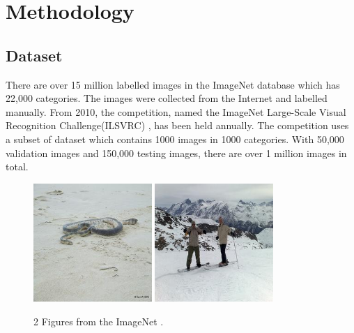 
\chapter{Methodology} %
\label{Chapter3}

\section{Dataset}

There are over 15 million labelled images in the ImageNet database which has 22,000 categories. The images were collected from the Internet and labelled manually. From 2010, the competition, named the ImageNet Large-Scale Visual Recognition Challenge(ILSVRC) \citep{deng2009imagenet}, has been held annually. The competition uses a subset of dataset which contains 1000 images in 1000 categories. With 50,000 validation images and 150,000 testing images, there are over 1 million images in total.
\graphicspath{ {./Figures/} }
\begin{figure}[!htb]
    \centering
	\includegraphics[width=0.4\textwidth]{ILSVRC2012_val_00000001.JPEG}
    \qquad
    \includegraphics[width=0.4\textwidth]{ILSVRC2012_val_00000002.JPEG}
    \caption{2 Figures from the ImageNet \citep{deng2009imagenet}.}%
    \label{fig:ImageNetExamples}%
\end{figure}

